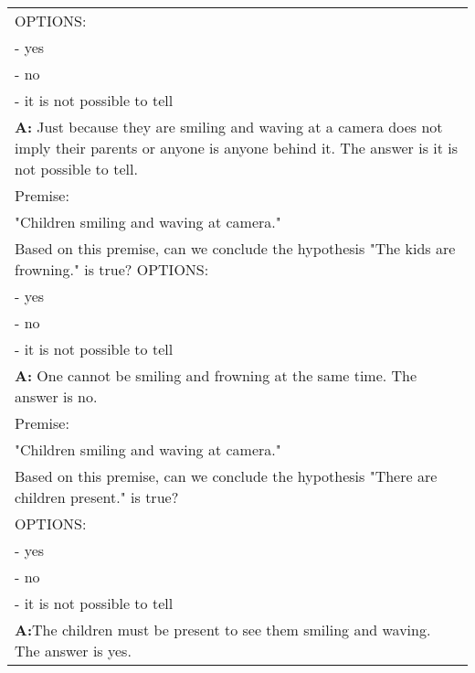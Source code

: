 \begin{table}[h]
\begin{tabular}{p{14cm}}
OPTIONS:\\
- yes\\
- no\\
- it is not possible to tell\\
\textbf{A:} Just because they are smiling and waving at a camera does not imply their parents or anyone is anyone behind it. The answer is it is not possible to tell.\\
\vspace{0mm}
Premise:\\
"Children smiling and waving at camera."\\
Based on this premise, can we conclude the hypothesis "The kids are frowning." is true?
OPTIONS:\\
- yes\\
- no\\
- it is not possible to tell\\
\textbf{A:} One cannot be smiling and frowning at the same time. The answer is no.\\
\vspace{0mm}
Premise:\\
"Children smiling and waving at camera."\\
Based on this premise, can we conclude the hypothesis "There are children present." is true?\\
OPTIONS:\\
- yes\\
- no\\
- it is not possible to tell\\
\textbf{A:}The children must be present to see them smiling and waving. The answer is yes.\\
        \bottomrule
    \end{tabular}
    \label{tab:prompt-esnli}
\end{table}



